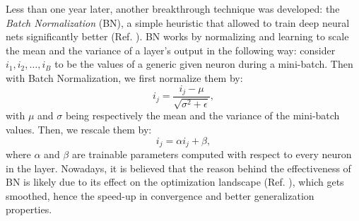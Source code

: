 \documentclass[LaM,binding=0.6cm]{./packages/sapthesis/sapthesis}
\begin{document}
        Less than one year later, another breakthrough technique was developed: the \textit{Batch Normalization} (BN), a simple heuristic that 
        allowed to train deep neural nets significantly better  (Ref. ). BN works by normalizing and learning to scale the mean and the variance of a layer's output
        in the following way: consider $i_1, i_2, \ldots, i_B$ to be the values of a generic given neuron during a mini-batch. Then with Batch Normalization,
        we first normalize them by:
        \begin{equation}
            i_j = \frac{i_j - \mu}{\sqrt{\sigma^2 + \epsilon}},
        \end{equation}
        with $\mu$ and $\sigma$ being respectively the mean and the variance of the mini-batch values. Then,
        we rescale them by:
        \begin{equation}
            i_j = \alpha i_j + \beta,
        \end{equation}
        where $\alpha$ and $\beta$ are trainable parameters computed with respect to every neuron in the layer.
        Nowadays, it is believed that the reason behind the effectiveness of BN is likely due to its effect on the 
        optimization landscape (Ref. ), which gets smoothed, hence the speed-up in convergence and better
        generalization properties.
\end{document}
